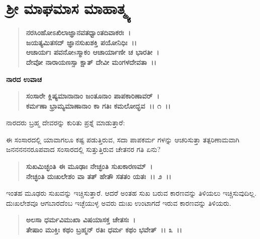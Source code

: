 

\begin{center}
\phantom{श्रीः}
\end{center}

\begin{center}
\phantom{।। श्री गुरुराजो विजयते~।।}
\end{center}


\chapter{ ಶ‍್ರೀ ಮಾಘಮಾಸ ಮಾಹಾತ್ಮ್ಯ}

\begin{verse}
\textbf{ನರಸಿಂಹೋಽಖಿಲಾಜ್ಞಾನವತಧ್ವಾಂತದಿವಾಕರಃ~। }\\\textbf{ಜಯತ್ಯಮಿತಸದ್ ಜ್ಞಾನಸುಖಶಕ್ತಿ ಪಯೋನಿಧಿಃ~।।}\\\textbf{ಆಚಾರ್ಯಃ ಪವನೋsಸ್ಮಾಕಂ ಆಚಾರ್ಯಾಣೀ ಚ ಭಾರತೀ~। }\\\textbf{ದೇವೋ ನಾರಾಯಣಸ್ಸಾ ಕ್ಷಾತ್ ದೇವೀ ಮಂಗಳದೇವತಾ~।।}
\end{verse}

\begin{flushleft}
\textbf{ನಾರದ ಉವಾಚ\enginline{-}}
\end{flushleft}

\begin{verse}
\textbf{ಸಂಸಾರೇ ಕ್ಲಿಷ್ಯಮಾನಾನಾಂ ಜಂತೂನಾಂ ಪಾಪಕಾರಿಣಾವರ್~। }\\\textbf{ಕರ್ಮಣಾ ಭ್ರಾಮ್ಯಮಾಣಾನಾಂ ಕಾ ಗತಿಃ ಕಮಲೋದ್ಭವ~।। ೧~।।}
\end{verse}

\noindent
ನಾರದರು ಬ್ರಹ್ಮ ದೇವರನ್ನು ಕುರಿತು ಪ್ರಶ್ನೆ ಮಾಡುತ್ತಾರೆ:\enginline{-}

ಈ ಸಂಸಾರದಲ್ಲಿ ಯಾವಾಗಲೂ ಕಷ್ಟ ಪಡುತ್ತಿರುವ, ಸದಾ ಪಾಪಕರ್ಮ ಗಳನ್ನು ಆಚರಿಸುತ್ತಾ ತತ್ಪರಿಣಾಮವಾಗಿ ಜನನನನನರೂಪವಾದ ಸಂಸಾರದಲ್ಲಿ ಸುತ್ತುತ್ತಿರುವ ಚೇತನರ ಗತಿ ಏನು?

\begin{verse}
\textbf{ಸುಖಮಿಚ್ಛಂತಿ ಈ ಮೂಢಾಃ ನೇಚ್ಛಂತಿ ಸುಖಕಾರಣಮ್~।}\\\textbf{ನೇಚ್ಛಂತಿ ದುಃಖಲೇಶಂ ವಾ ತತ್ ಹೇತೌ ಸತತಂ ಯತಃ~।। ೨~।।}
\end{verse}

ಇಂತಹ ಮೂಢರು ಸುಖವನ್ನು ಇಚ್ಚಿಸುತ್ತಾರೆ. ಆದರೆ ಅಂತಹ ಸುಖ ಬರುವ ಕಾರಣ\-ವನ್ನು ತಿಳಿಯಲು ಇಚ್ಚಿಸುವುದಿಲ್ಲ. ದುಃಖಲೇಶವೂ ಆಗಬಾರದೆಂಬ ಇಚ್ಛೆಯುಳ್ಳ ಅವರು ದುಃಖ ಉಂಟಾಗದೆ ಇರುವ ಕಾರಣವನ್ನು ತಿಳಿಯರು.

\begin{verse}
\textbf{ಅಲಸಾ ಧರ್ಮವಿಮುಖಾ ವಿಷಯಾಸಕ್ತ ಚೇತಸಃ~।}\\\textbf{ತೇಷಾಂ ಮುಕ್ತಿಃ ಕಥಂ ಬ್ರಹ್ಮನ್ ರತಿಃ ಧರ್ಮ ಕಥಂ ಭವೇತ್~।। ೩~।।}
\end{verse}

